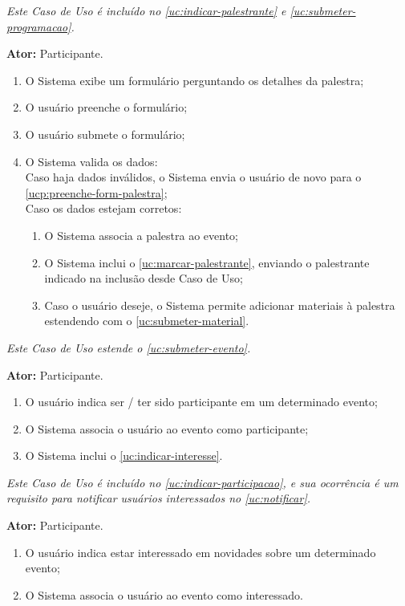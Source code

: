 \documentclass[12pt,a4paper,twoside,hyphens,english,brazil]{abntex2}
\begin{document}
{
\emph{Este Caso de Uso é incluído no \ref{uc:indicar-palestrante} e \ref{uc:submeter-programacao}.}

\textbf{Ator:} Participante.
\begin{enumerate}[itemsep=-1ex,topsep=-1ex]
	\item O Sistema exibe um formulário perguntando os detalhes da palestra; \label{ucp:preenche-form-palestra}
	\item O usuário preenche o formulário;
	\item O usuário submete o formulário;
	\item O Sistema valida os dados:
		\\Caso haja dados inválidos, o Sistema envia o usuário de novo para o \autoref{ucp:preenche-form-palestra};
		\\Caso os dados estejam corretos:
			\begin{enumerate}
				\item O Sistema associa a palestra ao evento;
				\item O Sistema inclui o \ref{uc:marcar-palestrante}, enviando o palestrante indicado na inclusão desde Caso de Uso;
				\item Caso o usuário deseje, o Sistema permite adicionar materiais à palestra estendendo com o \ref{uc:submeter-material}.
			\end{enumerate}
\end{enumerate}

\emph{Este Caso de Uso estende o \ref{uc:submeter-evento}.}

\textbf{Ator:} Participante.
\begin{enumerate}[itemsep=-1ex,topsep=-1ex]
	\item O usuário indica ser / ter sido participante em um determinado evento;
	\item O Sistema associa o usuário ao evento como participante;
	\item O Sistema inclui o \ref{uc:indicar-interesse}.
\end{enumerate}

\emph{Este Caso de Uso é incluído no \ref{uc:indicar-participacao}, e sua ocorrência é um requisito para notificar usuários interessados no \ref{uc:notificar}.}

\textbf{Ator:} Participante.
\begin{enumerate}[itemsep=-1ex,topsep=-1ex]
	\item O usuário indica estar interessado em novidades sobre um determinado evento;
	\item O Sistema associa o usuário ao evento como interessado.
\end{enumerate}

}
\end{document}
